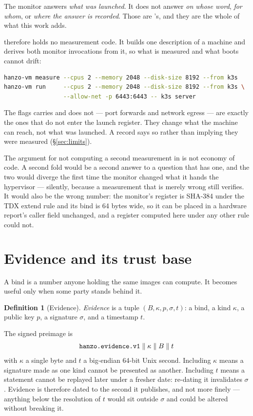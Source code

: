 \documentclass[11pt]{article}
\theoremstyle{definition}
\newtheorem{definition}{Definition}
\begin{document}
The monitor answers \emph{what was launched}. It does not answer \emph{on whose
word}, \emph{for whom}, or \emph{where the answer is recorded}. Those are
's, and they are the whole of what this work adds.

 therefore holds no measurement code. It builds one description of
a machine and derives both monitor invocations from it, so what is measured and
what boots cannot drift:

\begin{lstlisting}[language=bash]
hanzo-vm measure --cpus 2 --memory 2048 --disk-size 8192 --from k3s
hanzo-vm run     --cpus 2 --memory 2048 --disk-size 8192 --from k3s \
                 --allow-net -p 6443:6443 -- k3s server
\end{lstlisting}

The flags  carries and  does not --- port forwards and
network egress --- are exactly the ones that do not enter the launch register.
They change what the machine can reach, not what was launched. A record says so
rather than implying they were measured (§\ref{sec:limits}).

The argument for not computing a second measurement in  is not
economy of code. A second fold would be a second answer to a question that has
one, and the two would diverge the first time the monitor changed what it hands
the hypervisor --- silently, because a measurement that is merely wrong still
verifies. It would also be the wrong number: the monitor's register is
SHA-384 under the TDX extend rule and its bind is 64 bytes wide, so it can be
placed in a hardware report's caller field unchanged, and a register computed
here under any other rule could not.

\section{Evidence and its trust base}

A bind is a number anyone holding the same images can compute. It becomes useful
only when some party stands behind it.

\begin{definition}[Evidence]
\emph{Evidence} is a tuple $(B, \kappa, p, \sigma, t)$: a bind, a kind $\kappa$,
a public key $p$, a signature $\sigma$, and a timestamp $t$.
\end{definition}

The signed preimage is
\[
  \texttt{hanzo.evidence.v1} \;\|\; \kappa \;\|\; B \;\|\; t
\]
with $\kappa$ a single byte and $t$ a big-endian 64-bit Unix second. Including
$\kappa$ means a signature made as one kind cannot be presented as another.
Including $t$ means a statement cannot be replayed later under a fresher date:
re-dating it invalidates $\sigma$. Evidence is therefore dated to the second it
publishes, and not more finely --- anything below the resolution of $t$ would sit
outside $\sigma$ and could be altered without breaking it.
\end{document}
